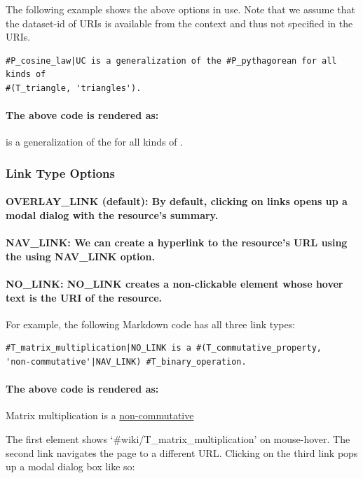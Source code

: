 \documentclass[a4paper]{article}
\begin{document}
The following example shows the above options in use. Note that we assume that the dataset-id of URIs is available from the context and thus not specified in the URIs.

\begin{verbatim}
#P_cosine_law|UC is a generalization of the #P_pythagorean for all kinds of
#(T_triangle, 'triangles').
\end{verbatim}

\paragraph{The above code is rendered as:}
\begin{mdframed}
 is a generalization of the  for all kinds of .
\end{mdframed}

\subsubsection{Link Type Options}

\paragraph{\textbf{OVERLAY\_LINK} (default): By default, clicking on links opens up a modal dialog with the resource's summary.}

\paragraph{\textbf{NAV\_LINK}: We can create a hyperlink to the resource's URL using the using NAV\_LINK option.}

\paragraph{\textbf{NO\_LINK}: NO\_LINK creates a non-clickable element whose hover text is the URI of the resource.}


For example, the following Markdown code has all three link types:
\begin{verbatim}
#T_matrix_multiplication|NO_LINK is a #(T_commutative_property, 
'non-commutative'|NAV_LINK) #T_binary_operation.
\end{verbatim}

\paragraph{The above code is rendered as:}
\begin{mdframed}
Matrix multiplication is a \underline{non-commutative} 
\end{mdframed}
The first element shows `\#wiki/T\_matrix\_multiplication' on mouse-hover. The second link navigates the page to a different URL. Clicking on the third link pops up a modal dialog box like so:
\end{document}
